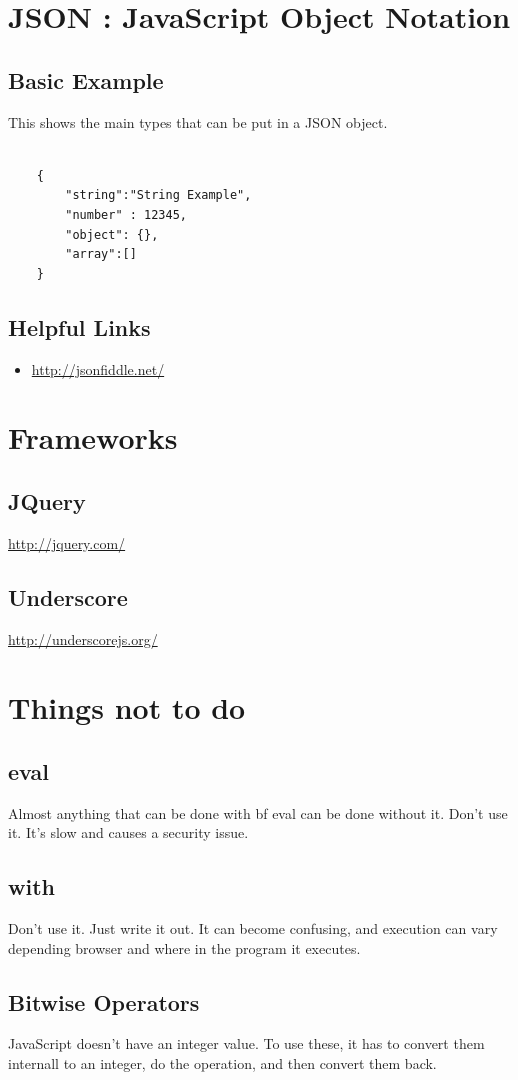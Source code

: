\documentclass {amsart}
\begin{document}
\section{JSON : JavaScript Object Notation}

	\subsection {Basic Example}  This shows the main types that can be put in a JSON object. 
	
	\begin{lstlisting}

	{
		"string":"String Example",
   		"number" : 12345,
   		"object": {},
   		"array":[]
  	}

	\end{lstlisting}

	\subsection{Helpful Links}
		\begin{itemize}
			\item \url{http://jsonfiddle.net/}
		\end{itemize}

\section{Frameworks}
	\subsection{JQuery}
		\url{http://jquery.com/}
	\subsection{Underscore}
		\url{http://underscorejs.org/}

\section{Things not to do}
	\subsection{eval}  Almost anything that can be done with {bf eval} can be done without it.  Don't use it.  It's slow and causes a security issue. 
	\subsection{with}  Don't use it.  Just write it out.  It can become confusing, and execution can vary depending browser and where in the program it executes.
	\subsection{Bitwise Operators}  JavaScript doesn't have an integer value.  To use these, it has to convert them internall to an integer, do the operation, and then convert them back. 
\end{document}
